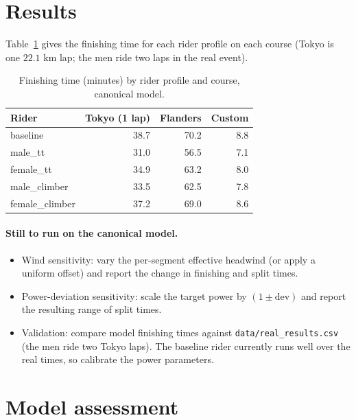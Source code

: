 \documentclass[11pt]{article}
\begin{document}
\section{Results}

Table~\ref{tab:matrix} gives the finishing time for each rider profile on each course (Tokyo is one $22.1$ km lap; the men ride two laps in the real event).

\begin{table}[h]\centering
\caption{Finishing time (minutes) by rider profile and course, canonical model.}
\label{tab:matrix}
\begin{tabular}{lrrr}
\toprule
Rider & Tokyo (1 lap) & Flanders & Custom \\
\midrule
baseline        & 38.7 & 70.2 & 8.8 \\
male\_tt         & 31.0 & 56.5 & 7.1 \\
female\_tt       & 34.9 & 63.2 & 8.0 \\
male\_climber    & 33.5 & 62.5 & 7.8 \\
female\_climber  & 37.2 & 69.0 & 8.6 \\
\bottomrule
\end{tabular}
\end{table}

\paragraph{Still to run on the canonical model.}
\begin{itemize}
  \item Wind sensitivity: vary the per-segment effective headwind (or apply a uniform offset) and report the change in finishing and split times.
  \item Power-deviation sensitivity: scale the target power by $(1 \pm \text{dev})$ and report the resulting range of split times.
  \item Validation: compare model finishing times against \texttt{data/real\_results.csv} (the men ride two Tokyo laps). The baseline rider currently runs well over the real times, so calibrate the power parameters.
\end{itemize}

\section{Model assessment}
\end{document}
